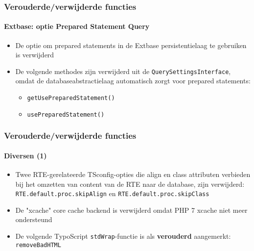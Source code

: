 \begin{frame}[fragile]
	\frametitle{Verouderde/verwijderde functies}
	\framesubtitle{Extbase: optie Prepared Statement Query}

	\begin{itemize}

		\item De optie om prepared statements in de Extbase persistentielaag te gebruiken is verwijderd

		\item De volgende methodes zijn verwijderd uit de \texttt{QuerySettingsInterface},
			omdat de databaseabstractielaag automatisch zorgt voor prepared statements:

			\begin{itemize}
				\item \texttt{getUsePreparedStatement()}
				\item \texttt{usePreparedStatement()}
			\end{itemize}

	\end{itemize}

\end{frame}


\begin{frame}[fragile]
	\frametitle{Verouderde/verwijderde functies}
	\framesubtitle{Diversen (1)}

	\begin{itemize}

		\item Twee RTE-gerelateerde TSconfig-opties die align en class attributen verbieden bij het omzetten van content
			van de RTE naar de database, zijn verwijderd:\newline
			\small
				\texttt{RTE.default.proc.skipAlign} en \texttt{RTE.default.proc.skipClass}
			\normalsize

		\item De "xcache" core cache backend is verwijderd omdat PHP 7 xcache niet meer ondersteund

		\item De volgende TypoScript \texttt{stdWrap}-functie is als \textbf{verouderd} aangemerkt:
			\texttt{removeBadHTML}

	\end{itemize}

\end{frame}


